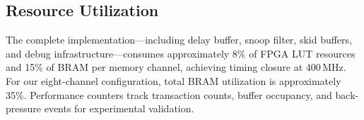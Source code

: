 \subsection{Resource Utilization}

The complete implementation---including delay buffer, snoop filter, skid buffers, and debug infrastructure---consumes approximately 8\% of FPGA LUT resources and 15\% of BRAM per memory channel, achieving timing closure at 400\,MHz.
For our eight-channel configuration, total BRAM utilization is approximately 35\%.
Performance counters track transaction counts, buffer occupancy, and back-pressure events for experimental validation.
